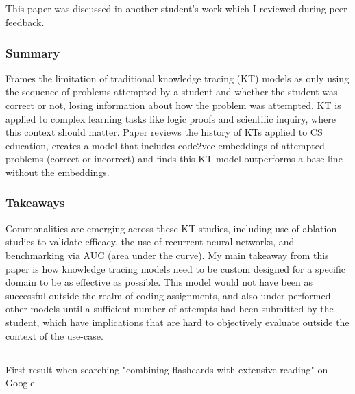 \documentclass[
	letterpaper, %
]{jdf}
\begin{document}
\subsection{}
This paper was discussed in another student's work which I reviewed during peer feedback.

\subsubsection{Summary}
Frames the limitation of traditional knowledge tracing (KT) models as only using the sequence of problems attempted by a student and whether the student was correct or not, losing information about how the problem was attempted. KT is applied to complex learning tasks like logic proofs and scientific inquiry, where this context should matter. Paper reviews the history of KTs applied to CS education, creates a model that includes code2vec embeddings of attempted problems (correct or incorrect) and finds this KT model outperforms a base line without the embeddings.

\subsubsection{Takeaways}
Commonalities are emerging across these KT studies, including use of ablation studies to validate efficacy, the use of recurrent neural networks, and benchmarking via AUC (area under the curve). My main takeaway from this paper is how knowledge tracing models need to be custom designed for a specific domain to be as effective as possible. This model would not have been as successful outside the realm of coding assignments, and also under-performed other models until a sufficient number of attempts had been submitted by the student, which have implications that are hard to objectively evaluate outside the context of the use-case.

\subsection{}
First result when searching "combining flashcards with extensive reading" on Google.
\end{document}
